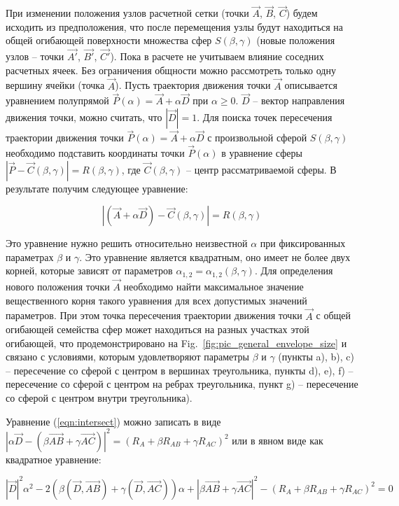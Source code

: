 \documentclass[
11pt,%
tightenlines,%
twoside,%
onecolumn,%
nofloats,%
nobibnotes,%
nofootinbib,%
superscriptaddress,%
noshowpacs,%
centertags]%
{revtex4}
\begin{document}
При изменении положения узлов расчетной сетки (точки $\vec{A}$, $\vec{B}$, $\vec{C}$) будем исходить из предположения, что после перемещения узлы будут находиться на общей огибающей поверхности множества сфер $S(\beta, \gamma)$ (новые положения узлов -- точки $\vec{A'}$, $\vec{B'}$, $\vec{C'}$).
Пока в расчете не учитываем влияние соседних расчетных ячеек.
Без ограничения общности можно рассмотреть только одну вершину ячейки (точка $\vec{A}$).
Пусть траектория движения точки $\vec{A}$ описывается уравнением полупрямой $\vec{P}(\alpha) = \vec{A} + \alpha \vec{D}$ при $\alpha \ge 0$.
$\vec{D}$ -- вектор направления движения точки, можно считать, что $|\vec{D}| = 1$.
Для поиска точек пересечения траектории движения точки $\vec{P}(\alpha) = \vec{A} + \alpha \vec{D}$ с произвольной сферой $S(\beta, \gamma)$ необходимо подставить координаты точки $\vec{P}(\alpha)$ в уравнение сферы $|\vec{P} - \vec{C}(\beta, \gamma)| = R(\beta, \gamma)$, где $\vec{C}(\beta, \gamma)$ -- центр рассматриваемой сферы.
В результате получим следующее уравнение:

\begin{equation}\label{eqn:intersect}
|(\vec{A} + \alpha \vec{D}) - \vec{C}(\beta, \gamma)| = R(\beta, \gamma)
\end{equation}

Это уравнение нужно решить относительно неизвестной $\alpha$ при фиксированных параметрах $\beta$ и $\gamma$.
Это уравнение является квадратным, оно имеет не более двух корней, которые зависят от параметров $\alpha_{1,2} = \alpha_{1,2}(\beta, \gamma)$.
Для определения нового положения точки $\vec{A}$ необходимо найти максимальное значение вещественного корня такого уравнения для всех допустимых значений параметров.
При этом точка пересечения траектории движения точки $\vec{A}$ с общей огибающей семейства сфер может находиться на разных участках этой огибающей, что продемонстрировано на Fig.~\ref{fig:pic_general_envelope_size} и связано с условиями, которым удовлетворяют параметры $\beta$ и $\gamma$ (пункты a), b), c) -- пересечение со сферой с центром в вершинах треугольника, пункты d), e), f) -- пересечение со сферой с центром на ребрах треугольника, пункт g) -- пересечение со сферой с центром внутри треугольника).

Уравнение (\ref{eqn:intersect}) можно записать в виде $|\alpha \vec{D} - (\beta \vec{AB} + \gamma \vec{AC})|^2 = (R_A + \beta R_{AB} + \gamma R_{AC})^2$ или в явном виде как квадратное уравнение:

\begin{equation}
|\vec{D}|^2 \alpha^2 - 2(\beta (\vec{D}, \vec{AB}) + \gamma (\vec{D}, \vec{AC})) \alpha + |\beta \vec{AB} + \gamma \vec{AC}|^2 - (R_A + \beta R_{AB} + \gamma R_{AC})^2 = 0
\end{equation}
\end{document}
